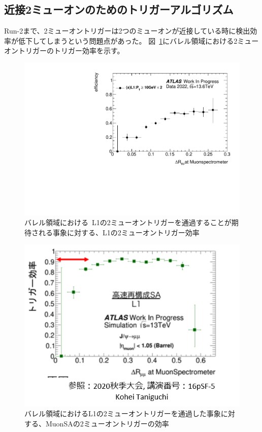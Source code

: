 \subsection{近接2ミューオンのためのトリガーアルゴリズム}\label{chapter3-3-1}
Run-2まで、2ミューオントリガーは2つのミューオンが近接している時に検出効率が低下してしまうという問題点があった。
図~\ref{fig:3-12}にバレル領域における2ミューオントリガーのトリガー効率を示す。

\begin{figure}[H]
    \centering
    \includegraphics[clip, width=12cm]{fig/3/L1_2MU10_eff.pdf}
    \caption{バレル領域における~L1の2ミューオントリガーを通過することが期待される事象に対する、L1の2ミューオントリガー効率}
    \label{fig:3-12}
\end{figure}

\begin{figure}[H]
    \centering
    \includegraphics[clip, width=12cm]{fig/3/l2saEff_taniguchi.png}
    \caption{バレル領域におけるL1の2ミューオントリガーを通過した事象に対する、MuonSAの2ミューオントリガーの効率}
    \label{fig:3-13}
\end{figure}

